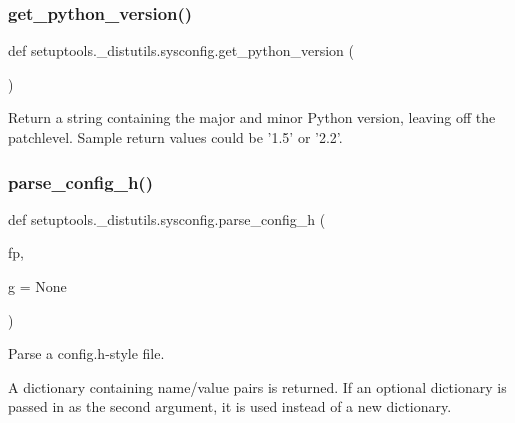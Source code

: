 \subsubsection{\texorpdfstring{get\+\_\+python\+\_\+version()}{get\_python\_version()}}
{\footnotesize\ttfamily def setuptools.\+\_\+distutils.\+sysconfig.\+get\+\_\+python\+\_\+version (\begin{DoxyParamCaption}{ }\end{DoxyParamCaption})}

\begin{DoxyVerb}Return a string containing the major and minor Python version,
leaving off the patchlevel.  Sample return values could be '1.5'
or '2.2'.
\end{DoxyVerb}
 \mbox{\label{namespacesetuptools_1_1__distutils_1_1sysconfig_a2eca1576cacb3c3143a36f4a777c2c6f}} 
\subsubsection{\texorpdfstring{parse\+\_\+config\+\_\+h()}{parse\_config\_h()}}
{\footnotesize\ttfamily def setuptools.\+\_\+distutils.\+sysconfig.\+parse\+\_\+config\+\_\+h (\begin{DoxyParamCaption}\item[{}]{fp,  }\item[{}]{g = {\ttfamily None} }\end{DoxyParamCaption})}

\begin{DoxyVerb}Parse a config.h-style file.

A dictionary containing name/value pairs is returned.  If an
optional dictionary is passed in as the second argument, it is
used instead of a new dictionary.
\end{DoxyVerb}
 \mbox{\label{namespacesetuptools_1_1__distutils_1_1sysconfig_a0107d6148fc958a5fb7dfe195899f08a}} 
